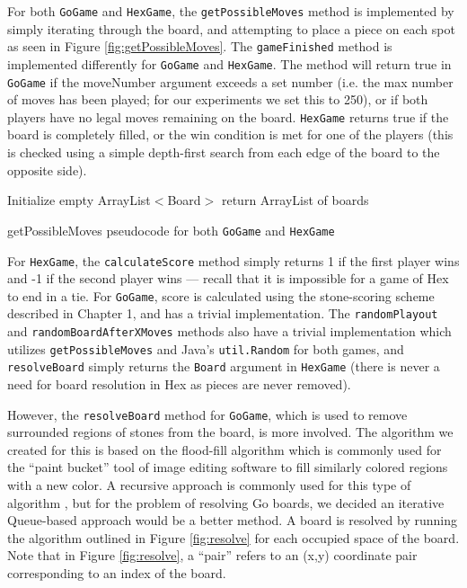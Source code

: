 For both \texttt{GoGame} and \texttt{HexGame}, the \texttt{getPossibleMoves} method is implemented by simply iterating through the board, and attempting to place a piece on each spot as seen in Figure \ref{fig:getPossibleMoves}.  The \texttt{gameFinished} method is implemented differently for \texttt{GoGame} and \texttt{HexGame}.  The method will return true in \texttt{GoGame} if the moveNumber argument exceeds a set number (i.e. the max number of moves has been played; for our experiments we set this to 250), or if both players have no legal moves remaining on the board.  \texttt{HexGame} returns true if the board is completely filled, or the win condition is met for one of the players (this is checked using a simple depth-first search from each edge of the board to the opposite side).

\begin{algorithm}[htbp]
 \SetAlgoLined %
 
 Initialize empty ArrayList$<$Board$>$\;
 return ArrayList of boards\;
 \caption{getPossibleMoves pseudocode for both \texttt{GoGame} and \texttt{HexGame}}
\label{fig:getPossibleMoves}
\end{algorithm}

For \texttt{HexGame}, the \texttt{calculateScore} method simply returns 1 if the first player wins and -1 if the second player wins --- recall that it is impossible for a game of Hex to end in a tie.  For \texttt{GoGame}, score is calculated using the stone-scoring scheme described in Chapter 1, and has a trivial implementation.  The \texttt{randomPlayout} and \texttt{randomBoardAfterXMoves} methods also have a trivial implementation which utilizes \texttt{getPossibleMoves} and Java's \texttt{util.Random} for both games, and \texttt{resolveBoard} simply returns the \texttt{Board} argument in \texttt{HexGame} (there is never a need for board resolution in Hex as pieces are never removed).

However, the \texttt{resolveBoard} method for \texttt{GoGame}, which is used to remove surrounded regions of stones from the board, is more involved.  The algorithm we created for this is based on the flood-fill algorithm \cite{torbert} which is commonly used for the ``paint bucket'' tool of image editing software to fill similarly colored regions with a new color.  A recursive approach is commonly used for this type of algorithm \cite{torbert}, but for the problem of resolving Go boards, we decided an iterative Queue-based approach would be a better method.  A board is resolved by running the algorithm outlined in Figure \ref{fig:resolve} for each occupied space of the board.  Note that in Figure \ref{fig:resolve}, a ``pair'' refers to an (x,y) coordinate pair corresponding to an index of the board.

